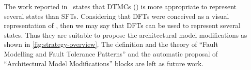 \documentclass[12pt,openright,twoside,a4paper,oldfontcommands,english,brazil,final]{abntex2}
\theoremstyle{theo}
\begin{document}
The work reported in~\cite{SAE1996b} states that \acp{DTMC} () is more appropriate to represent several states than \acp{SFT}.
Considering that \acp{DFT} were conceived as a visual representation of , then we may say that \acp{DFT} can be used to represent several states.
Thus they are suitable to propose the architectural model modifications as shown in \cref{fig:strategy-overview}.
The definition and the theory of ``Fault Modelling and Fault Tolerance Patterns'' and the automatic proposal of ``Architectural Model Modifications'' blocks are left as future work.


\postextual
  

\end{document}

